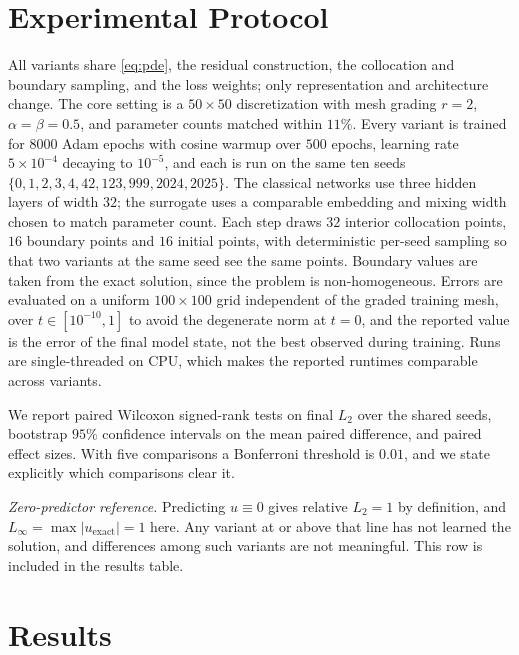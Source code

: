 \documentclass[journal]{IEEEtran}
\begin{document}
\section{Experimental Protocol}
All variants share \eqref{eq:pde}, the residual construction, the collocation and
boundary sampling, and the loss weights; only representation and architecture
change. The core setting is a $50\times50$ discretization with mesh grading $r=2$,
$\alpha=\beta=0.5$, and parameter counts matched within $11\%$. Every variant is
trained for $8000$ Adam epochs with cosine warmup over $500$ epochs, learning rate
$5\times10^{-4}$ decaying to $10^{-5}$, and each is run on the same ten seeds
$\{0,1,2,3,4,42,123,999,2024,2025\}$. The classical networks use three hidden
layers of width $32$; the surrogate uses a comparable embedding and mixing width
chosen to match parameter count. Each step draws $32$ interior collocation points,
$16$ boundary points and $16$ initial points, with deterministic per-seed
sampling so that two variants at the same seed see the same points. Boundary
values are taken from the exact solution, since the problem is
non-homogeneous. Errors are evaluated on a uniform $100\times100$ grid independent
of the graded training mesh, over $t\in[10^{-10},1]$ to avoid the degenerate norm
at $t=0$, and the reported value is the error of the final model state, not the
best observed during training. Runs are single-threaded on CPU, which makes the
reported runtimes comparable across variants.

We report paired Wilcoxon signed-rank tests on final $L_2$ over the shared seeds,
bootstrap $95\%$ confidence intervals on the mean paired difference, and paired
effect sizes. With five comparisons a Bonferroni threshold is $0.01$, and we state
explicitly which comparisons clear it.

\emph{Zero-predictor reference.} Predicting $u\equiv0$ gives relative $L_2=1$ by
definition, and $L_\infty=\max|u_{\mathrm{exact}}|=1$ here. Any variant at or above
that line has not learned the solution, and differences among such variants are
not meaningful. This row is included in the results table.

\section{Results}
\end{document}
